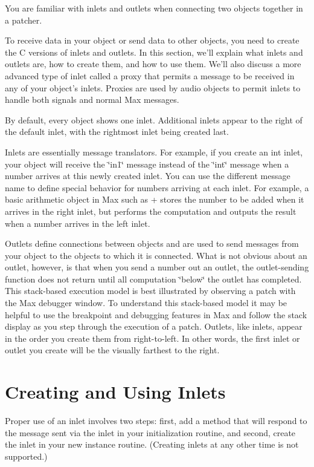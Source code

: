 You are familiar with inlets and outlets when connecting two objects together in a patcher.

To receive data in your object or send data to other objects, you need to create the C versions of inlets and outlets. In this section, we'll explain what inlets and outlets are, how to create them, and how to use them. We'll also discuss a more advanced type of inlet called a proxy that permits a message to be received in any of your object's inlets. Proxies are used by audio objects to permit inlets to handle both signals and normal Max messages.

By default, every object shows one inlet. Additional inlets appear to the right of the default inlet, with the rightmost inlet being created last.

Inlets are essentially message translators. For example, if you create an int inlet, your object will receive the \char`\"{}in1\char`\"{} message instead of the \char`\"{}int\char`\"{} message when a number arrives at this newly created inlet. You can use the different message name to define special behavior for numbers arriving at each inlet. For example, a basic arithmetic object in Max such as + stores the number to be added when it arrives in the right inlet, but performs the computation and outputs the result when a number arrives in the left inlet.

Outlets define connections between objects and are used to send messages from your object to the objects to which it is connected. What is not obvious about an outlet, however, is that when you send a number out an outlet, the outlet-\/sending function does not return until all computation \char`\"{}below\char`\"{} the outlet has completed. This stack-\/based execution model is best illustrated by observing a patch with the Max debugger window. To understand this stack-\/based model it may be helpful to use the breakpoint and debugging features in Max and follow the stack display as you step through the execution of a patch. Outlets, like inlets, appear in the order you create them from right-\/to-\/left. In other words, the first inlet or outlet you create will be the visually farthest to the right.\hypertarget{chapter_inout_chapter_inout_inlets}{}\section{Creating and Using Inlets}\label{chapter_inout_chapter_inout_inlets}
Proper use of an inlet involves two steps: first, add a method that will respond to the message sent via the inlet in your initialization routine, and second, create the inlet in your new instance routine. (Creating inlets at any other time is not supported.)

